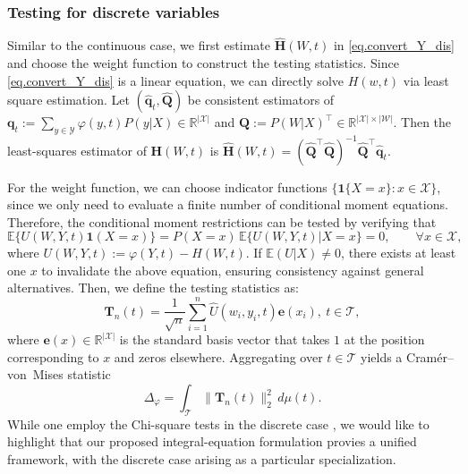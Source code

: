 \documentclass[
  12pt]{article}
\def\H{\mathbf{H}}
\def\T{\mathbf{T}}
\def\wh{\widehat}
\def\cT{\mathcal{T}}
\begin{document}
\subsubsection{Testing for discrete variables}
\label{sec.test_discrete}
Similar to the continuous case, we first estimate $\wh{\H}(W,t)$ in \eqref{eq.convert_Y_dis} and choose the weight function to construct the testing statistics. Since \eqref{eq.convert_Y_dis} is a linear equation, we can directly solve $H(w,t)$ via least square estimation. Let $(\widehat{\mathbf{q}}_t, \widehat{\mathbf{Q}})$ be consistent estimators of $\mathbf{q}_t := \sum_{y \in \mathcal{Y}} \varphi(y,t) P(y | X) \in \mathbb{R}^{|\mathcal{X}|}$ and $\mathbf{Q} := P(W | X)^{\top} \in \mathbb{R}^{|\mathcal{X}| \times |\mathcal{W}|}$.
Then the least-squares estimator of $\mathbf{H}(W,t)$ is
$
\widehat{\mathbf{H}}(W,t) = (\widehat{\mathbf{Q}}^{\top} \widehat{\mathbf{Q}})^{-1} 
\widehat{\mathbf{Q}}^{\top} \widehat{\mathbf{q}}_t.
$

For the weight function, we can choose indicator functions 
$\{\mathbf{1}\{X = x\} : x \in \mathcal{X}\}$, since we only need to evaluate a finite number of conditional moment equations. 
Therefore, the conditional moment restrictions can be tested by verifying that
$$
\mathbb{E}\{U(W,Y,t) \mathbf{1}(X=x)\} 
= P(X=x) \, \mathbb{E}\{U(W,Y,t) | X=x\} = 0,
\qquad \forall x \in \mathcal{X},
$$
where $U(W,Y,t) := \varphi(Y,t) - H(W,t)$.  
If $\mathbb{E}(U | X) \neq 0$, there exists at least one $x$ to invalidate the above equation, ensuring consistency against general alternatives. Then, we define the testing statistics as:
\begin{equation}\label{eq.tn_st_dis}
    \T_n(t) =\frac{1}{\sqrt{n}}\sum_{i=1}^n{\widehat{U}(w_i,y_i,t)\mathbf{e}(x_i)}, \ t \in \cT,
\end{equation}
where $\mathbf{e}(x) \in \mathbb{R}^{|\mathcal{X}|}$ is the standard basis vector that takes $1$ at the position corresponding to $x$ and zeros elsewhere.  
Aggregating over $t \in \mathcal{T}$ yields a Cram\'er--von~Mises
 statistic
\begin{equation}\label{eq.icm-statistics_dis}
   \Delta_{\varphi} = \int_{\mathcal{T}} \| \T_n(t) \|_2^2 \, d\mu(t).
\end{equation}
While one employ the Chi-square tests in the discrete case \citep{miao2018identifying, miao2023identifying}, we would like to highlight that our proposed integral-equation formulation provies a unified framework, with the discrete case arising as a particular specialization. 
\end{document}
